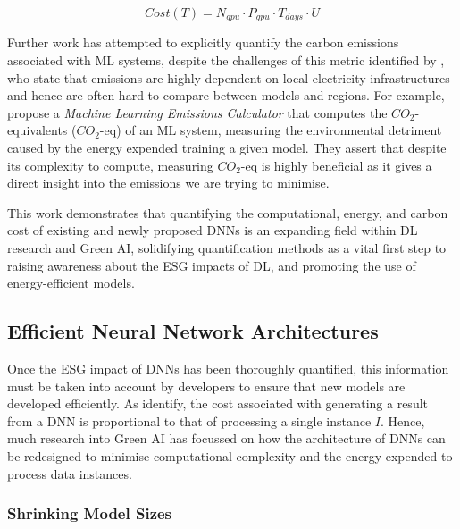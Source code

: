 \documentclass[a4paper, 11pt]{report}
\begin{document}
    \begin{equation}
        \label{eq: cost-t}
        Cost(T) = N_{gpu} \cdot P_{gpu} \cdot T_{days} \cdot U
    \end{equation}

    Further work has attempted to explicitly quantify the carbon emissions associated with ML systems, despite the challenges of this metric identified by \citet{schwartz-2019}, who state that emissions are highly dependent on local electricity infrastructures and hence are often hard to compare between models and regions. For example, \citet{lacoste-2019} propose a \emph{Machine Learning Emissions Calculator} that computes the $CO_2$-equivalents ($CO_2$-eq) of an ML system, measuring the environmental detriment caused by the energy expended training a given model. They assert that despite its complexity to compute, measuring $CO_2$-eq is highly beneficial as it gives a direct insight into the emissions we are trying to minimise.

    This work demonstrates that quantifying the computational, energy, and carbon cost of existing and newly proposed DNNs is an expanding field within DL research and Green AI, solidifying quantification methods as a vital first step to raising awareness about the ESG impacts of DL, and promoting the use of energy-efficient models.


    \subsection{Efficient Neural Network Architectures}

    Once the ESG impact of DNNs has been thoroughly quantified, this information must be taken into account by developers to ensure that new models are developed efficiently. As \citet{schwartz-2019} identify, the cost associated with generating a result from a DNN is proportional to that of processing a single instance $I$. Hence, much research into Green AI has focussed on how the architecture of DNNs can be redesigned to minimise computational complexity and the energy expended to process data instances. 


    \subsubsection{Shrinking Model Sizes}
\end{document}
